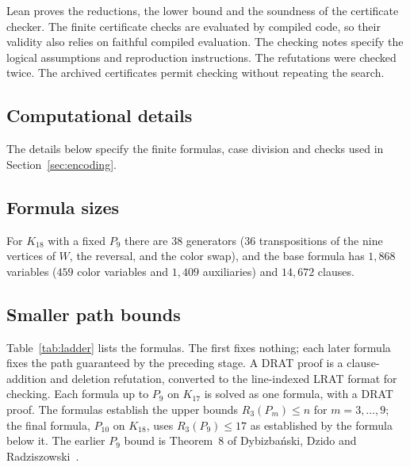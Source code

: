 \documentclass[11pt]{article}
\theoremstyle{definition}
\theoremstyle{remark}
\newcommand{\R}{R_3}
\begin{document}
Lean proves the reductions, the lower bound and the soundness of the
certificate checker. The finite certificate checks are evaluated by compiled code, so their
validity also relies on faithful compiled evaluation. The checking notes
specify the logical assumptions and reproduction instructions.
The refutations were checked twice. The archived certificates \cite{Gra26} permit
checking without repeating the search.

\clearpage
\begin{appendices}
\section{Computational details}\label{sec:computation}
The details below specify the finite formulas, case division and checks
used in Section~\ref{sec:encoding}.

\subsection{Formula sizes}
For $K_{18}$ with a fixed $P_9$ there are $38$
generators ($36$ transpositions of the nine vertices of $W$, the reversal,
and the color swap), and the base formula has $1{,}868$ variables ($459$
color variables and $1{,}409$ auxiliaries) and $14{,}672$ clauses.


\subsection{Smaller path bounds}
Table~\ref{tab:ladder} lists the formulas. The first fixes nothing; each later
formula fixes the path guaranteed by the preceding stage. A DRAT proof is a
clause-addition and deletion refutation, converted to the line-indexed LRAT
format for checking. Each formula up to
$P_9$ on $K_{17}$ is solved as one formula, with a DRAT proof. The formulas
establish the upper bounds $\R(P_m)\le n$ for $m=3,\dots,9$; the final
formula, $P_{10}$ on $K_{18}$, uses $\R(P_9)\le17$ as established by the
formula below it. The earlier $P_9$ bound is Theorem~8 of Dybizbański,
Dzido and Radziszowski~\cite{DDR16}.


\end{appendices}
\end{document}
